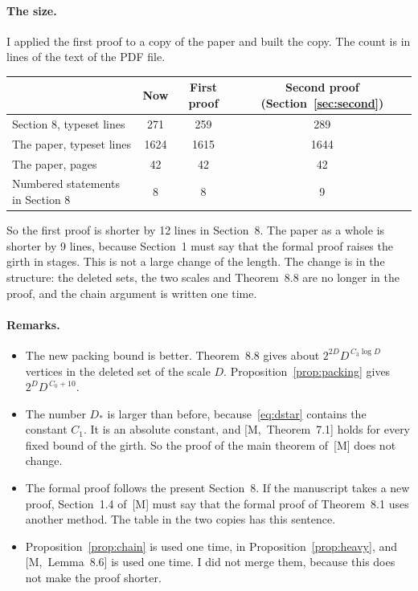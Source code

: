 \documentclass[11pt]{article}
\newcommand{\M}[1]{[M,~#1]}
\begin{document}
\paragraph{The size.} I applied the first proof to a copy of the paper and built the copy. The
count is in lines of the text of the PDF file.
\begin{center}
\small
\begin{tabular}{@{}lccc@{}}
\toprule
 & Now & First proof & Second proof (Section~\ref{sec:second})\\
\midrule
Section 8, typeset lines & 271 & 259 & 289\\
The paper, typeset lines & 1624 & 1615 & 1644\\
The paper, pages & 42 & 42 & 42\\
Numbered statements in Section 8 & 8 & 8 & 9\\
\bottomrule
\end{tabular}
\end{center}
So the first proof is shorter by 12 lines in Section~8. The paper as a whole is shorter by 9
lines, because Section~1 must say that the formal proof raises the girth in stages. This is not a
large change of the length. The change is in the structure: the deleted sets, the two scales and
Theorem~8.8 are no longer in the proof, and the chain argument is written one time.

\paragraph{Remarks.}
\begin{itemize}[leftmargin=1.2em]
\item The new packing bound is better. Theorem~8.8 gives about
$2^{2D}D^{\,C_3\log D}$ vertices in the deleted set of the scale $D$.
Proposition~\ref{prop:packing} gives $2^{D}D^{\,C_0+10}$.
\item The number $D_*$ is larger than before, because~\eqref{eq:dstar} contains the constant
$C_1$. It is an absolute constant, and \M{Theorem~7.1} holds for every fixed bound of the girth.
So the proof of the main theorem of~[M] does not change.
\item The formal proof follows the present Section~8. If the manuscript takes a new proof,
Section~1.4 of~[M] must say that the formal proof of Theorem~8.1 uses another method. The table
in the two copies has this sentence.
\item Proposition~\ref{prop:chain} is used one time, in Proposition~\ref{prop:heavy}, and
\M{Lemma~8.6} is used one time. I did not merge them, because this does not make the proof
shorter.
\end{itemize}
\end{document}
